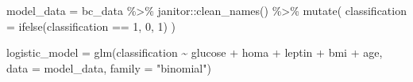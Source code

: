 \documentclass[
]{article}
\newenvironment{Shaded}{\begin{snugshade}}{\end{snugshade}}
\newcommand{\AttributeTok}[1]{\textcolor[rgb]{0.77,0.63,0.00}{#1}}
\newcommand{\DecValTok}[1]{\textcolor[rgb]{0.00,0.00,0.81}{#1}}
\newcommand{\FunctionTok}[1]{\textcolor[rgb]{0.00,0.00,0.00}{#1}}
\newcommand{\NormalTok}[1]{#1}
\newcommand{\OtherTok}[1]{\textcolor[rgb]{0.56,0.35,0.01}{#1}}
\newcommand{\SpecialCharTok}[1]{\textcolor[rgb]{0.00,0.00,0.00}{#1}}
\newcommand{\StringTok}[1]{\textcolor[rgb]{0.31,0.60,0.02}{#1}}
\begin{document}
\begin{Shaded}
\begin{Highlighting}[]
\NormalTok{model\_data }\OtherTok{=}\NormalTok{ bc\_data }\SpecialCharTok{\%\textgreater{}\%} 
\NormalTok{  janitor}\SpecialCharTok{::}\FunctionTok{clean\_names}\NormalTok{() }\SpecialCharTok{\%\textgreater{}\%} 
  \FunctionTok{mutate}\NormalTok{(}
    \AttributeTok{classification =} \FunctionTok{ifelse}\NormalTok{(classification }\SpecialCharTok{==} \DecValTok{1}\NormalTok{, }\DecValTok{0}\NormalTok{, }\DecValTok{1}\NormalTok{)}
\NormalTok{  )}

\NormalTok{logistic\_model }\OtherTok{=} \FunctionTok{glm}\NormalTok{(classification }\SpecialCharTok{\textasciitilde{}}\NormalTok{ glucose }\SpecialCharTok{+}\NormalTok{ homa }\SpecialCharTok{+}\NormalTok{ leptin }\SpecialCharTok{+}\NormalTok{ bmi }\SpecialCharTok{+}\NormalTok{ age, }\AttributeTok{data =}\NormalTok{ model\_data, }\AttributeTok{family =} \StringTok{"binomial"}\NormalTok{)}


\end{Highlighting}
\end{Shaded}
\end{document}
